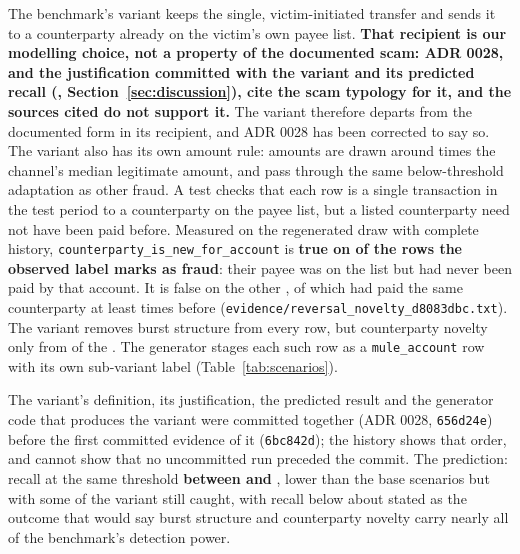 The benchmark's variant keeps the single, victim-initiated transfer and sends it to a counterparty
already on the victim's own payee list. \textbf{That recipient is our modelling choice, not a property
of the documented scam: ADR 0028, and the justification committed with the variant and its predicted recall
(, Section~\ref{sec:discussion}), cite the scam
typology for it, and the sources cited do not support it.} The variant therefore departs from the
documented form in its recipient, and ADR 0028 has been corrected to say so. The variant also has its own amount rule: amounts are drawn around \nRevAmountMultiplier{} times
the channel's median legitimate amount, and pass through the same below-threshold adaptation as other
fraud. A test checks that each row is a single transaction in the test period to
a counterparty on the payee list, but a listed counterparty need not have been paid before.
Measured on the regenerated draw with complete history,
\texttt{counterparty\_is\_new\_for\_account} is \textbf{true on \nRevNovelScored{} of the
\nRevFraud{} rows the observed label marks as fraud}: their payee was on the list but had never been paid by that
account. It is false on the other \nRevNotNovelScored{}, \nRevPriorThreePlus{} of which had paid
the same counterparty at least \nRevPriorThreshold{} times before
(\texttt{evidence/\allowbreak reversal\_\allowbreak novelty\_\allowbreak d8083dbc.txt}). The
variant removes burst structure from every row, but counterparty novelty only from
\nRevNotNovelScored{} of the \nRevFraud{}. The generator stages each such row as a \texttt{mule\_account} row
with its own sub-variant label (Table~\ref{tab:scenarios}).

The variant's definition, its justification, the predicted result and the generator code that
produces the variant were committed together (ADR 0028, \texttt{656d24e}) before the first committed evidence of it (\texttt{6bc842d}); the history shows that
order, and cannot show that no uncommitted run preceded the commit. The prediction: recall at
the same threshold \textbf{between \nRevPredLow{} and \nRevPredHigh{}}, lower than the base
scenarios but with some of the variant still caught, with recall below about \nRevPredFloor{} stated as the outcome that would
say burst structure and counterparty novelty carry nearly all of the benchmark's detection power.

